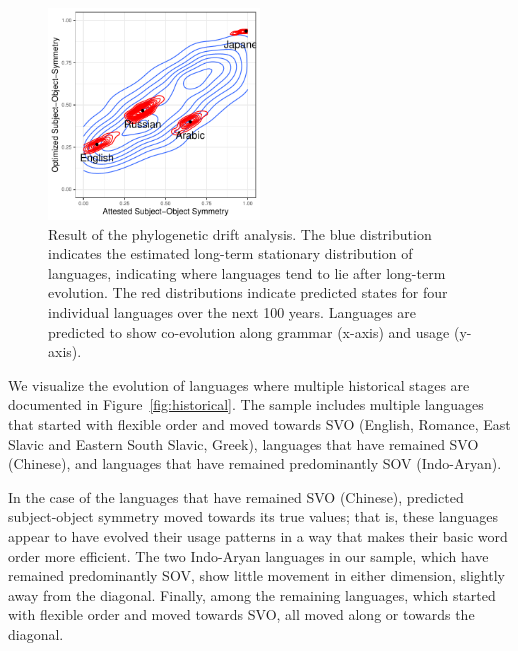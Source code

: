 \documentclass[11pt,a4paper]{article}
\begin{document}
\begin{figure}
    \centering
    \includegraphics[width=0.5\textwidth]{../change/visualize/stationary.pdf}
    \caption{Result of the phylogenetic drift analysis.
    The blue distribution indicates the estimated long-term stationary distribution of languages, indicating where languages tend to lie after long-term evolution.
    The red distributions indicate predicted states for four individual languages over the next 100 years. Languages are predicted to show co-evolution along grammar (x-axis)  and usage (y-axis).}
    \label{fig:drift-model}
\end{figure}



We visualize the evolution of languages where multiple historical stages are documented in Figure~\ref{fig:historical}.
The sample includes multiple languages that started with flexible order and moved towards SVO (English, Romance, East Slavic and Eastern South Slavic, Greek), languages that have remained SVO (Chinese), and languages that have remained predominantly SOV (Indo-Aryan).

In the case of the languages that have remained SVO (Chinese), predicted subject-object symmetry moved towards its true values; that is, these languages appear to have evolved their usage patterns in a way that makes their basic word order more efficient.
The two Indo-Aryan languages in our sample, which have remained predominantly SOV, show little movement in either dimension, slightly away from the diagonal.
Finally, among the remaining languages, which started with flexible order and moved towards SVO, all moved along or towards the diagonal.
\end{document}
